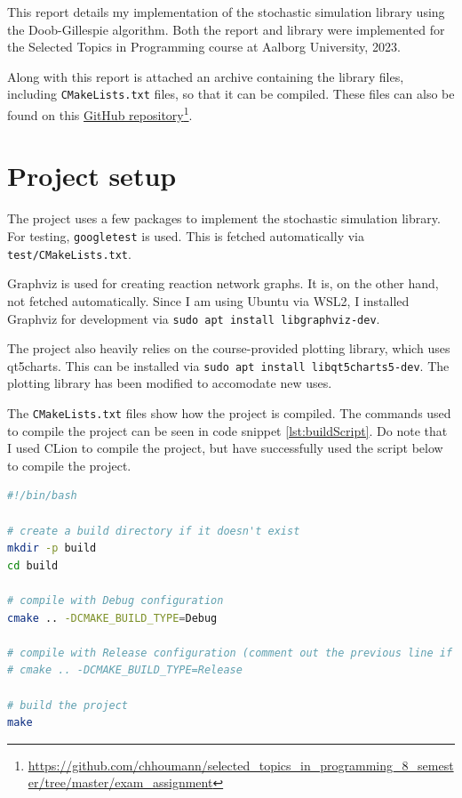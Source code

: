 This report details my implementation of the stochastic simulation library using the Doob-Gillespie algorithm.
Both the report and library were implemented for the Selected Topics in Programming course at Aalborg University, 2023.

Along with this report is attached an archive containing the library files, including \texttt{CMakeLists.txt} files, so that it can be compiled.
These files can also be found on this \href{https://github.com/chhoumann/selected_topics_in_programming_8_semester/tree/master/exam_assignment}{GitHub repository}\footnote{\url{https://github.com/chhoumann/selected_topics_in_programming_8_semester/tree/master/exam_assignment}}.

\section{Project setup}
The project uses a few packages to implement the stochastic simulation library.
For testing, \texttt{googletest} is used. This is fetched automatically via \texttt{test/CMakeLists.txt}.

Graphviz is used for creating reaction network graphs. It is, on the other hand, not fetched automatically.
Since I am using Ubuntu via WSL2, I installed Graphviz for development via \texttt{sudo apt install libgraphviz-dev}.

The project also heavily relies on the course-provided plotting library, which uses qt5charts.
This can be installed via \texttt{sudo apt install libqt5charts5-dev}. The plotting library has been modified to accomodate new uses.

The \texttt{CMakeLists.txt} files show how the project is compiled.
The commands used to compile the project can be seen in code snippet \ref{lst:buildScript}. 
Do note that I used CLion to compile the project, but have successfully used the script below to compile the project.

\begin{lstlisting}[language=bash, caption={Bash script for building project}, label={lst:buildScript}, style=colorBash]
#!/bin/bash

# create a build directory if it doesn't exist
mkdir -p build
cd build

# compile with Debug configuration
cmake .. -DCMAKE_BUILD_TYPE=Debug

# compile with Release configuration (comment out the previous line if you want to compile in Release mode)
# cmake .. -DCMAKE_BUILD_TYPE=Release

# build the project
make
\end{lstlisting}

